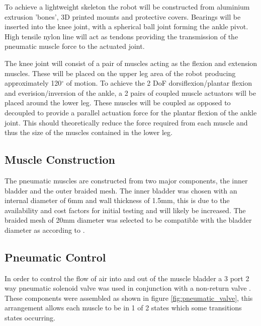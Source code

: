 \documentclass[11pt,a4paper]{article}
\begin{document}
To achieve a lightweight skeleton the robot will be constructed from aluminium extrusion 'bones', 3D printed mounts and protective covers. Bearings will be inserted into the knee joint, with a spherical ball joint forming the ankle pivot. High tensile nylon line will act as tendons providing the transmission of the pneumatic muscle force to the actuated joint. \newline

The knee joint will consist of a pair of muscles acting as the flexion and extension muscles. These will be placed on the upper leg area of the robot producing approximately 120$^{\circ}$ of motion. To achieve the 2 DoF dorsiflexion/plantar flexion and everision/inversion of the ankle, a 2 pairs of coupled muscle actuators will be placed around the lower leg. These muscles will be coupled as opposed to decoupled to provide a parallel actuation force for the plantar flexion of the ankle joint. This should theoretically reduce the force required from each muscle and thus the size of the muscles contained in the lower leg. 

\subsection{Muscle Construction}
\label{sub:muscle_construction}
The pneumatic muscles are constructed from two major components, the inner bladder and the outer braided mesh. The inner bladder was chosen with an internal diameter of 6mm and wall thickness of 1.5mm, this is due to the availability and cost factors for initial testing and will likely be increased. The braided mesh of 20mm diameter was selected to be compatible with the bladder diameter as according to \cite{andrikopoulos_nikolakopoulos_2017}.

\subsection{Pneumatic Control}
\label{sub:pneumatic_control}

In order to control the flow of air into and out of the muscle bladder a 3 port 2 way pneumatic solenoid valve was used in conjunction with a non-return valve \cite{airsky_pneumatic}. These components were assembled as shown in figure \ref{fig:pneumatic_valve}, this arrangement allows each muscle to be in 1 of 2 states which some transitions states occurring.
\end{document}

